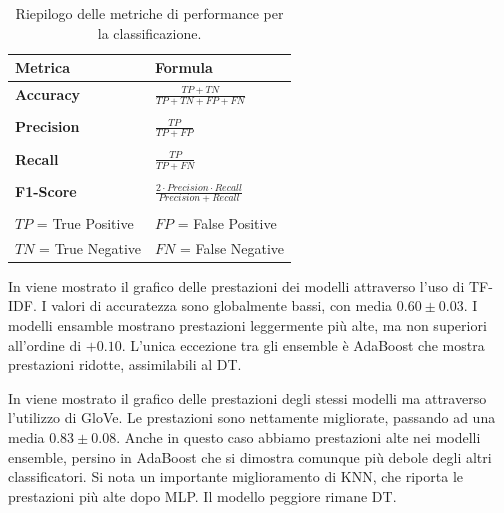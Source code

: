 \documentclass[12pt, a4paper, twoside]{article}
\numberwithin{table}{section}
\begin{document}
    \begin{table}
        \centering
        \begin{tabular}{ll}
        \toprule
        \textbf{Metrica} & \textbf{Formula} \\ 
        \midrule
        \textbf{Accuracy}   & $\displaystyle \frac{TP + TN}{TP + TN + FP + FN}$ \\ \\ 
        \textbf{Precision}  & $\displaystyle \frac{TP}{TP + FP}$ \\ \\
        \textbf{Recall}     & $\displaystyle \frac{TP}{TP + FN}$ \\ \\
        \textbf{F1-Score}   & $\displaystyle \frac{2 \cdot Precision \cdot Recall }{Precision + Recall}$ \\ \\
        \midrule
        $TP$ = True Positive  & $FP$ = False Positive \\
        $TN$ = True Negative  & $FN$ = False Negative \\
        \bottomrule
        \end{tabular}
        \caption{Riepilogo delle metriche di performance per la classificazione.}
        \label{tab:metriche}
    \end{table}
    
    In  viene mostrato il grafico delle prestazioni dei modelli attraverso l'uso di TF-IDF. I valori di accuratezza sono globalmente bassi, con media $0.60 \pm 0.03$. I modelli ensamble mostrano prestazioni leggermente più alte, ma non superiori all'ordine di $+0.10$. L'unica eccezione tra gli ensemble è AdaBoost che mostra prestazioni ridotte, assimilabili al DT.

    In  viene mostrato il grafico delle prestazioni degli stessi modelli ma attraverso l'utilizzo di GloVe. Le prestazioni sono nettamente migliorate, passando ad una media $0.83 \pm 0.08$. Anche in questo caso abbiamo prestazioni alte nei modelli ensemble, persino in AdaBoost che si dimostra comunque più debole degli altri classificatori. Si nota un importante miglioramento di KNN, che riporta le prestazioni più alte dopo MLP. Il modello peggiore rimane DT.
\end{document}
